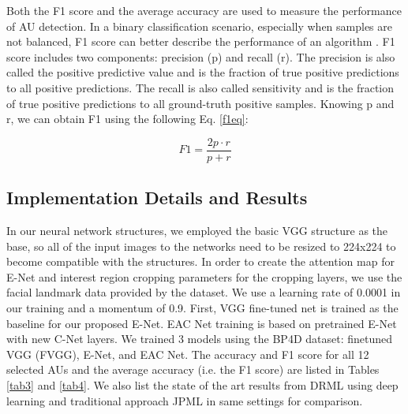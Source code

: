 \documentclass[a4paper, 10pt, conference]{ieeeconf}      %
\begin{document}
{\color {black} Both the F1 score and the average accuracy are used to measure the performance of AU detection. In a binary classification scenario, especially when samples are not balanced, F1 score can better describe the performance of an algorithm \cite{p9,p10}. F1 score includes two components: precision (p) and recall (r). The precision is also called the positive predictive value and is the fraction of true positive predictions to all positive predictions. The recall is also called sensitivity and is the fraction of true positive predictions to all ground-truth positive samples.  Knowing p and r, we can obtain F1 using the following Eq. \ref{f1eq}}:

\begin{equation}
\label{f1eq}
F1=\frac{2p\cdot r}{p+r}
\end{equation}

\subsection{Implementation Details and Results}
In our neural network structures, we employed the basic VGG structure as the base, so all of the input images to the networks need to be resized to 224x224 to become compatible with the structures. In order to create the attention map for E-Net and interest region cropping parameters for the cropping layers, we use the facial landmark data provided by the dataset. We use a learning rate of 0.0001 in our training and a momentum of 0.9. First, VGG fine-tuned net is trained as the baseline for our proposed E-Net. EAC Net training is based on pretrained E-Net with new C-Net layers.  
We trained 3 models using the BP4D dataset: finetuned VGG (FVGG), E-Net, and EAC Net. The accuracy and F1 score for all 12 selected AUs and the average accuracy (i.e. the F1 score) are listed in Tables \ref{tab3} and \ref{tab4}. We also list the state of the art results from DRML \cite{p22} using deep learning and traditional approach JPML \cite{p13} in same settings for comparison. 
\end{document}
